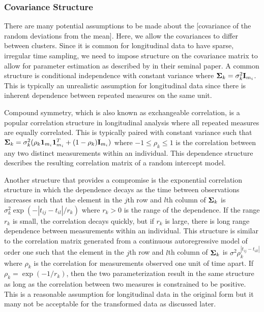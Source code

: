 \subsubsection{Covariance Structure}
There are many potential assumptions to be made about the [covariance of the random deviations from the mean]. Here, we allow the covariances to differ between clusters. Since it is common for longitudinal data to have sparse, irregular time sampling, we need to impose structure on the covariance matrix to allow for parameter estimation as described by \textcite{jennrich1986} in their seminal paper. A common structure is conditional independence with constant variance where $\mathbf \Sigma_{k}= \sigma_{k}^{2}\mathbf I_{m_{i}}$. This is typically an unrealistic assumption for longitudinal data since there is inherent dependence between repeated measures on the same unit. 

Compound symmetry, which is also known as exchangeable correlation, is a popular correlation structure in longitudinal analysis where all repeated measures are equally correlated. This is typically paired with constant variance such that $\mathbf \Sigma_{k} = \sigma_{k}^{2}(\rho_{k}\mathbf1_{m_{i}}\mathbf1_{m_{i}}^{T}+(1-\rho_{k})\mathbf I_{m_{i}})$ where $-1\leq\rho_{k}\leq 1$ is the correlation between any two distinct measurements within an individual. This dependence structure describes the resulting correlation matrix of a random intercept model.

Another structure that provides a compromise is the exponential correlation structure in which the dependence decays as the time between observations increases such that the element in the $j$th row and $l$th column of $\boldsymbol\Sigma_{k}$ is $\sigma_{k}^{2}\exp(-| t_{ij}-t_{il}| / r_{k})$ where $r_{k}> 0$ is the range of the dependence. If the range $r_{k}$ is small, the correlation decays quickly, but if $r_{k}$ is large, there is long range dependence between measurements within an individual. This structure is similar to the correlation matrix generated from a continuous autoregressive model of order one such that the element in the $j$th row and $l$th column of $\boldsymbol\Sigma_{k}$ is $\sigma^{2}\rho_{k}^{|t_{ij}-t_{ill}|}$ where $\rho_{k}$ is the correlation for measurements observed one unit of time apart. If $\rho_{k} = \exp(-1/r_{k})$, then the two parameterization result in the same structure as long as the correlation between two measures is constrained to be positive. This is a reasonable assumption for longitudinal data in the original form but it many not be acceptable for the transformed data as discussed later.

